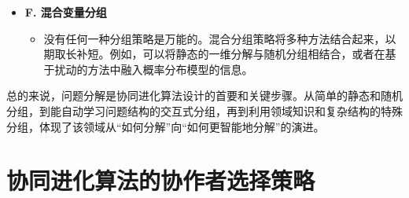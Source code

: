 \begin{itemize}
    \item \textbf{F. 混合变量分组}
    \begin{itemize}
        \item 没有任何一种分组策略是万能的。混合分组策略将多种方法结合起来，以期取长补短。例如，可以将静态的一维分解与随机分组相结合，或者在基于扰动的方法中融入概率分布模型的信息。
    \end{itemize}
\end{itemize}

总的来说，问题分解是协同进化算法设计的首要和关键步骤。从简单的静态和随机分组，到能自动学习问题结构的交互式分组，再到利用领域知识和复杂结构的特殊分组，体现了该领域从“如何分解”向“如何更智能地分解”的演进。

\section{协同进化算法的协作者选择策略}

